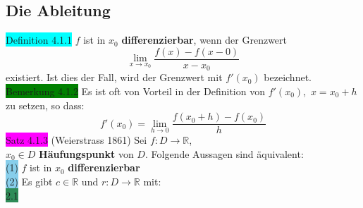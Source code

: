 \documentclass[landscape, 10pt]{article}
\newcommand{\R}{\mathbb{R}}
\begin{document}
\begin{multicols}{3}
       \subsection{Die Ableitung}
              \colorbox{cyan}{Definition 4.1.1} 
                     \textcolor{NavyBlue}{$f$} ist in 
                     \textcolor{NavyBlue}{$x_0$} 
                     \textbf{differenzierbar}, 
                     wenn der Grenzwert 
                     \begin{equation*}
                            \lim\limits_{x\to x_0}
                            \frac{f(x)-f(x-0)}{x-x_0}
                     \end{equation*}
                     existiert. Ist dies der Fall, wird 
                     der Grenzwert mit 
                     \textcolor{NavyBlue}{$f'(x_0)$} 
                     bezeichnet.\\
              \colorbox{green}{Bemerkung 4.1.2} 
                     Es ist oft von Vorteil in der Definition von 
                     \textcolor{NavyBlue}{$f'(x_0)$},\,
                     \textcolor{NavyBlue}{$x=x_0+h$} 
                     zu setzen, so dass: 
                     \begin{equation*}
                            f'(x_0)
                            =\lim\limits_{h\to 0}
                            \frac{f(x_0+h)-f(x_0)}{h}
                     \end{equation*}
              \colorbox{magenta}{Satz 4.1.3} 
              (Weierstrass 1861) 
                     Sei \textcolor{NavyBlue}{
                     $f:D\longrightarrow\R$},\\
                     \textcolor{NavyBlue}{$x_0\in D$}
                     \textbf{Häufungspunkt} von 
                     \textcolor{NavyBlue}{$D$}. 
                     Folgende Aussagen sind 
                     äquivalent: \\
                     \colorbox{SkyBlue}{(1)} 
                            \textcolor{NavyBlue}{$f$} ist in 
                            \textcolor{NavyBlue}{$x_0$} 
                            \textbf{differenzierbar} \\
                     \colorbox{SkyBlue}{(2)} 
                            Es gibt 
                            \textcolor{NavyBlue}{$c\in\R$} und 
                            \textcolor{NavyBlue}{
                            $r:D\longrightarrow\R$} mit: \\
                            \colorbox{SeaGreen}{2.1} 
                                   \textcolor{NavyBlue}{
}
\end{multicols}
\end{document}
